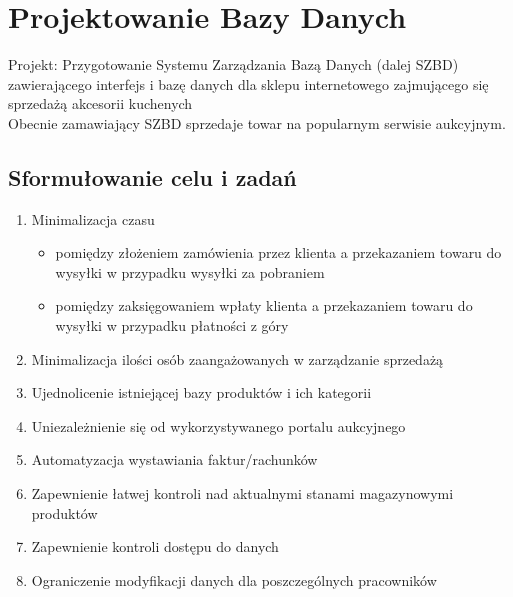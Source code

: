 \chapter{Projektowanie Bazy Danych}
Projekt: Przygotowanie Systemu Zarządzania Bazą Danych (dalej SZBD) zawierającego interfejs i bazę danych dla sklepu internetowego zajmującego się sprzedażą akcesorii kuchenych\\
Obecnie zamawiający SZBD sprzedaje towar na popularnym serwisie aukcyjnym.\\ 
\section{Sformułowanie celu i zadań}
\begin{enumerate}
\item Minimalizacja czasu
\begin{itemize}
\item pomiędzy złożeniem zamówienia przez klienta a przekazaniem towaru do wysyłki w przypadku wysyłki za pobraniem
\item pomiędzy zaksięgowaniem wpłaty klienta a przekazaniem towaru do wysyłki w przypadku płatności z góry 
\end{itemize} 
\item Minimalizacja ilości osób zaangażowanych w zarządzanie sprzedażą
\item Ujednolicenie istniejącej bazy produktów i ich kategorii
\item Uniezależnienie się od wykorzystywanego portalu aukcyjnego
\item Automatyzacja wystawiania faktur/rachunków
\item Zapewnienie łatwej kontroli nad aktualnymi stanami magazynowymi produktów
\item Zapewnienie kontroli dostępu do danych
\item Ograniczenie modyfikacji danych dla poszczególnych pracowników 
\end{enumerate}

